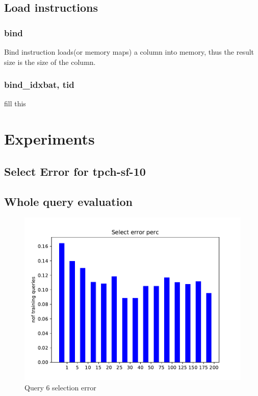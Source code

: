 \documentclass{article}
\begin{document}
\subsection{Load instructions}
\subsubsection{bind}
Bind instruction loads(or memory maps) a column into memory,
thus the result size is the size of the column.
\subsubsection{bind\_idxbat, tid}
fill this
\section{Experiments}
\subsection{Select Error for tpch-sf-10}

\subsection{Whole query evaluation}

\begin{figure}[ht]
  \centering
  \includegraphics[scale=0.7]{figs/select_error_q6.pdf}
  \caption{Query 6 selection error}
  \label{fig:sel6}
\end{figure}
\end{document}

